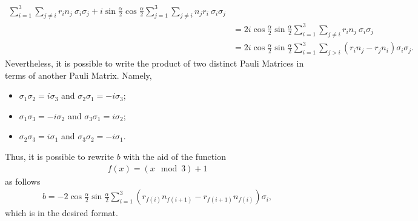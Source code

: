\begin{enumerate}[label=\alph*)]
\begin{align}
            \sum_{i = 1}^3 \sum_{j \neq i} r_i n_j\ \sigma_i \sigma_j
            +
            i \sin\frac{\alpha}{2}\cos\frac{\alpha}{2}
            \sum_{j = 1}^3\sum_{j \neq i} n_j r_i\ \sigma_i \sigma_j \\
        &= 2 i \cos\frac{\alpha}{2}\sin\frac{\alpha}{2}
            \sum_{i = 1}^3 \sum_{j \neq i} r_i n_j\ \sigma_i \sigma_j \\
        &= 2 i \cos\frac{\alpha}{2}\sin\frac{\alpha}{2}
            \sum_{i = 1}^3 \sum_{j > i} (r_i n_j - r_j n_i) \sigma_i \sigma_j .
    \end{align}
    Nevertheless, it is possible to write the product of two distinct
    Pauli Matrices in terms of another Pauli Matrix. Namely,
    \begin{itemize}
        \item $\sigma_1 \sigma_2 = i \sigma_3$ and
            $\sigma_2 \sigma_1 = -i \sigma_3$;
        \item $\sigma_1 \sigma_3 = -i \sigma_2$ and
            $\sigma_3 \sigma_1 = i \sigma_2$;
        \item $\sigma_2 \sigma_3 = i \sigma_1$ and
            $\sigma_3 \sigma_2 = -i \sigma_1$.    
    \end{itemize}
    Thus, it is possible to rewrite $b$ with the aid of the function
    \begin{align}
        f(x) = (x \mod 3) + 1
    \end{align}
    as follows
    \begin{align}
        b = - 2 \cos \frac{\alpha}{2} \sin \frac{\alpha}{2}
            \sum_{i = 1}^3 (r_{f(i)}n_{f(i + 1)} - r_{f(i+1)}n_{f(i)}) \sigma_i ,
    \end{align}
    which is in the desired format.
    

\end{enumerate}
